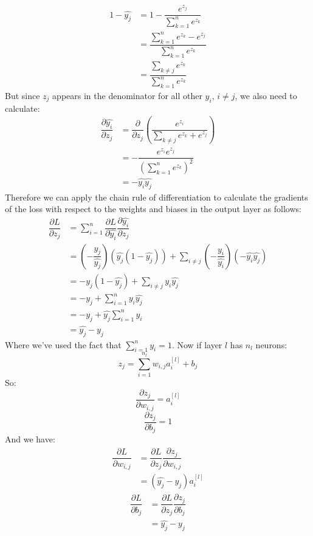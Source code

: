 \documentclass[11pt]{article} %
\theoremstyle{plain}
\theoremstyle{definition}
\begin{document}
\begin{align*}
1-\hat{y_j} &= 1 - \dfrac{e^{z_j}}{\sum_{k=1}^n e^{z_k}} \\
&= \dfrac {\sum_{k=1}^n e^{z_k} - e^{z_j}}{\sum_{k=1}^n e^{z_k}} \\
&= \dfrac {\sum_{k \neq j} e^{z_k}}{\sum_{k=1}^n e^{z_k}}
\end{align*}
But since \(z_j\) appears in the denominator for all other \(y_i\), \(i \neq j\), we also need to calculate:
\begin{align*}
\dfrac{\partial \hat{y_i}}{\partial z_j} &= \dfrac{\partial }{\partial z_j} (\dfrac{e^{z_i}}{\sum_{k \neq j} e^{z_k} + e^{z_j}})  \\
&= -\dfrac{e^{z_i}e^{z_j}}{(\sum_{k=1}^n e^{z_k})^2} \\
&= -\hat{y_i}\hat{y_j}
\end{align*}
Therefore we can apply the chain rule of differentiation to calculate the gradients of the loss with respect to the weights and biases in the output layer as follows:
\begin{align*}
\dfrac{\partial L}{\partial z_j} &= \sum_{i=1}^n \dfrac{\partial L}{\partial \hat{y_i}} \dfrac{\partial \hat{y_i}}{\partial z_j} \\
&= (-\dfrac {y_j}{\hat{y_j}}) (\hat{y_j}(1-\hat{y_j})) + \sum_{i \neq j} (-\dfrac {y_i}{\hat{y_i}})(-\hat{y_i}\hat{y_j}) \\
&= -y_j(1-\hat{y_j}) + \sum_{i \neq j} y_i\hat{y_j} \\
&= -y_j + \sum_{i = 1}^n y_i\hat{y_j}  \\
&= -y_j + \hat{y_j}\sum_{i = 1}^n y_i \\ 
&= \hat{y_j} - y_j 
\end{align*}
Where we've used the fact that \(\sum_{i=1}^n y_i =1 \). Now if layer \(l\) has \(n_l\) neurons:
\[ z_j = \sum_{i=1}^{n_l} w_{i,j}a^{[l]}_i + b_j\]
So:
\[ \dfrac{\partial z_j}{\partial w_{i,j}} = a^{[l]}_i \]
\[ \dfrac{\partial z_j}{\partial b_j} = 1 \]
And we have:
\begin{align*}
\dfrac{\partial L}{\partial w_{i,j}} &= \dfrac{\partial L}{\partial z_j}\dfrac{\partial z_j}{\partial w_{i,j}} \\
&= (\hat{y_j}-y_j)a^{[l]}_i
\end{align*}
\begin{align*}
\dfrac{\partial L}{\partial b_j} &= \dfrac{\partial L}{\partial z_j}\dfrac{\partial z_j}{\partial b_j} \\
&= \hat{y_j}-y_j
\end{align*}
\end{document}

